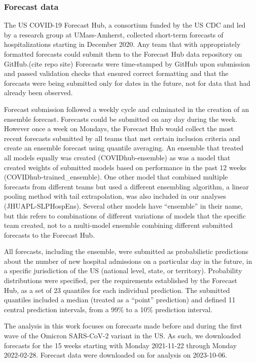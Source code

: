 \documentclass{article}\usepackage[]{graphicx}\usepackage[]{xcolor}
\begin{document}
\subsubsection{Forecast data}
The US COVID-19 Forecast Hub, a consortium funded by the US CDC and led by a research group at UMass-Amherst, collected short-term forecasts of hospitalizations starting in December 2020.\citep{cramer_united_2022}
Any team that with appropriately formatted forecasts could submit them to the Forecast Hub data repository on GitHub.(cite repo site)
Forecasts were time-stamped by GitHub upon submission and passed validation checks that ensured correct formatting and that the forecasts were being submitted only for dates in the future, not for data that had already been observed.

Forecast submission followed a weekly cycle and culminated in the creation of an ensemble forecast.
Forecasts could be submitted on any day during the week.
However once a week on Mondays, the Forecast Hub would collect the most recent forecasts submitted by all teams that met certain inclusion criteria and create an ensemble forecast using quantile averaging.\citep{ray_comparing_2023}
An ensemble that treated all models equally was created (COVIDhub-ensemble) as was a model that created weights of submitted models based on performance in the past 12 weeks (COVIDhub-trained\_ensemble).
One other model that combined multiple forecasts from different teams but used a different ensembling algorithm, a linear pooling method with tail extrapolation, was also included in our analyses (JHUAPL-SLPHospEns).
Several other models have ``ensemble'' in their name, but this refers to combinations of different variations of models that the specific team created, not to a multi-model ensemble combining different submitted forecasts to the Forecast Hub.

All forecasts, including the ensemble, were submitted as probabilistic predictions about the number of new hospital admissions on a particular day in the future, in a specific jurisdiction of the US (national level, state, or territory).
Probability distributions were specified, per the requirements established by the Forecast Hub, as a set of 23 quantiles for each individual prediction.
The submitted quantiles included a median (treated as a ``point'' prediction) and defined 11 central prediction intervals, from a 99\% to a 10\% prediction interval.

The analysis in this work focuses on forecasts made before and during the first wave of the Omicron SARS-CoV-2 variant in the US.
As such, we downloaded forecasts for the 15 weeks starting with Monday 2021-11-22 through Monday 2022-02-28.
Forecast data were downloaded on for analysis on 2023-10-06.
\end{document}
